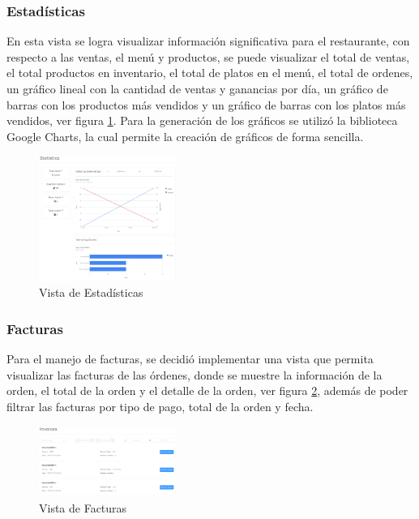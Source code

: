 \subsubsection{Estadísticas}

En esta vista se logra visualizar información significativa para el 
restaurante, con respecto a las ventas, el menú y productos, se puede 
visualizar el total de ventas, el total productos en inventario, el total 
de platos en el menú, el total de ordenes, un gráfico lineal con la 
cantidad de ventas y ganancias por día, un gráfico de barras con los  
productos más vendidos y un gráfico de barras con los platos más vendidos, 
ver figura \ref{fig:statistics}. Para la generación de los gráficos se 
utilizó la biblioteca Google Charts, la cual permite la creación de
gráficos de forma sencilla.

\begin{figure}[H]
    \centering
    \includegraphics[width=0.4\textwidth]{assets/statistics.png}
    \caption{Vista de Estadísticas}
    \label{fig:statistics}
\end{figure}

\subsubsection{Facturas}

Para el manejo de facturas, se decidió implementar una vista que permita 
visualizar las facturas de las órdenes, donde se muestre la información de 
la orden, el total de la orden y el detalle de la orden, ver figura 
\ref{fig:invoices}, además de poder filtrar las facturas por tipo de pago, 
total de la orden y fecha.

\begin{figure}[H]
    \centering
    \includegraphics[width=0.4\textwidth]{assets/invoices.png}
    \caption{Vista de Facturas}
    \label{fig:invoices}
\end{figure}

